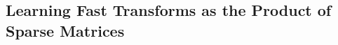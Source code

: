 %

%
%


%
%
%


\subsection{Learning Fast Transforms as the Product of Sparse Matrices}
\label{sec:palm4msa}


